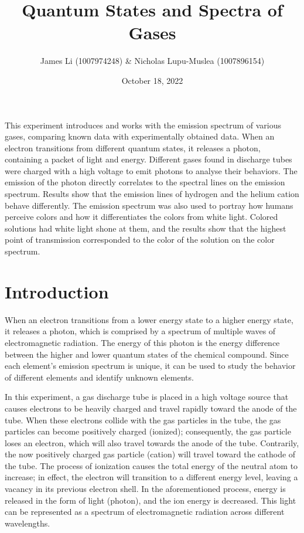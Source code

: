 \documentclass[10pt, letterpaper, twoside]{article}
\title{\textbf{Quantum States and Spectra of Gases}\vspace{-1.5em}}
\author{James Li (1007974248) & Nicholas Lupu-Muslea (1007896154)}\vspace{-2em}
\date{October 18, 2022}
\renewenvironment{abstract}
 {\small
  \begin{center}
  \bfseries \abstractname\vspace{-.5em}\vspace{0pt}
  \end{center}
  \list{}{
    \setlength{\leftmargin}{1.32cm}%
    \setlength{\rightmargin}{\leftmargin}%
  }%
  \item\relax}
 {\endlist}
\begin{document}
\maketitle
\vspace{-3em}

\begin{abstract}
   This experiment introduces and works with the emission spectrum of various gases, comparing known data with experimentally obtained data. When an electron transitions from different quantum states, it releases a photon, containing a packet of light and energy. Different gases found in discharge tubes were charged with a high voltage to emit photons to analyse their behaviors. The emission of the photon directly correlates to the spectral lines on the emission spectrum. Results show that the emission lines of hydrogen and the helium cation behave differently. The emission spectrum was also used to portray how humans perceive colors and how it differentiates the colors from white light. Colored solutions had white light shone at them, and the results show that the highest point of transmission corresponded to the color of the solution on the color spectrum.
\end{abstract}

\section{Introduction}

When an electron transitions from a lower energy state to a higher energy state, it releases a photon, which is comprised by a spectrum of multiple waves of electromagnetic radiation. The energy of this photon is the energy difference between the higher and lower quantum states of the chemical compound. Since each element's emission spectrum is unique, it can be used to study the behavior of different elements and identify unknown elements.

In this experiment, a gas discharge tube is placed in a high voltage source that causes electrons to be heavily charged and travel rapidly toward the anode of the tube. When these electrons collide with the gas particles in the tube, the gas particles can become positively charged (ionized); consequently, the gas particle loses an electron, which will also travel towards the anode of the tube. Contrarily, the now positively charged gas particle (cation) will travel toward the cathode of the tube. The process of ionization causes the total energy of the neutral atom to increase; in effect, the electron will transition to a different energy level, leaving a vacancy in its previous electron shell. In the aforementioned process, energy is released in the form of light (photon), and the ion energy is decreased. This light can be represented as a spectrum of electromagnetic radiation across different wavelengths.
\end{document}
